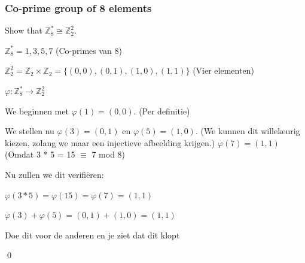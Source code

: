 \subsubsection{Co-prime group of 8 elements}

Show that \(\mathds{Z}_8^* \cong \mathds{Z}_2^2\).


\(\mathds{Z}_8^* = {1,3,5,7}\) (Co-primes van 8)

\(\mathds{Z}_2^2 = \mathds{Z}_2 \times \mathds{Z}_2 = \{(0,0), (0,1), (1,0), (1,1)\}\) (Vier elementen)

\(\varphi: \mathds{Z}_8^* \to \mathds{Z}_2^2\)

We beginnen met \(\varphi(1) = (0,0)\). (Per definitie)

We stellen nu \(\varphi(3) = (0,1)\) en \(\varphi(5) = (1,0)\). (We kunnen dit willekeurig kiezen, zolang we maar een injectieve afbeelding krijgen.)
\(\varphi(7) = (1,1)\) (Omdat 3 * 5 = 15 \(\equiv\) 7 mod 8)

Nu zullen we dit verifiëren:

\(
\varphi(3 * 5) = \varphi(15) = \varphi(7) = (1,1)
\)

\(\varphi(3) + \varphi(5) = (0,1) + (1,0) = (1,1)\)

Doe dit voor de anderen en je ziet dat dit klopt

\qed
